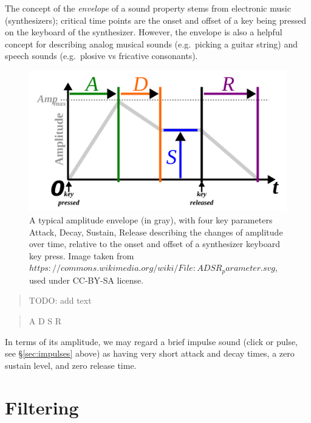 \documentclass[
]{book}
\begin{document}
The concept of the \emph{envelope} of a sound property stems from electronic music (synthesizers); critical time points are the onset and offset of a key being pressed on the keyboard of the synthesizer. However, the envelope is also a helpful concept for describing analog musical sounds (e.g.~picking a guitar string) and speech sounds (e.g.~plosive vs fricative consonants).

\begin{figure}

{\centering \includegraphics{figures/ADSR_parameter} 

}

\caption{A typical amplitude envelope (in gray), with four key parameters Attack, Decay, Sustain, Release describing the changes of amplitude over time, relative to the onset and offset of a synthesizer keyboard key press. Image taken from  $https://commons.wikimedia.org/wiki/File:ADSR_parameter.svg$, used under CC-BY-SA license.}\label{fig:envelope}
\end{figure}

\begin{quote}
TODO: add text
\end{quote}

\begin{quote}
A
D
S
R
\end{quote}

In terms of its amplitude, we may regard a brief impulse sound (click or pulse, see §\ref{sec:impulses} above) as having very short attack and decay times, a zero sustain level, and zero release time.

\chapter{Filtering}\label{ch-filtering}
\end{document}
